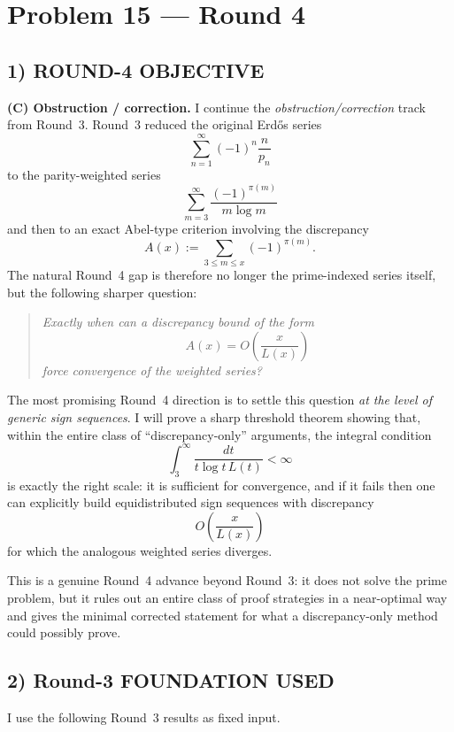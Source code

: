 \section{Problem 15 --- Round 4}

\subsection*{1) ROUND-4 OBJECTIVE}

\textbf{(C) Obstruction / correction.}
I continue the \emph{obstruction/correction} track from Round~3.
Round~3 reduced the original Erd\H{o}s series
\[
\sum_{n=1}^\infty (-1)^n\frac{n}{p_n}
\]
to the parity-weighted series
\[
\sum_{m=3}^\infty \frac{(-1)^{\pi(m)}}{m\log m}
\]
and then to an exact Abel-type criterion involving the discrepancy
\[
A(x):=\sum_{3\le m\le x}(-1)^{\pi(m)}.
\]
The natural Round~4 gap is therefore no longer the prime-indexed series itself, but the following sharper question:

\begin{quote}
\emph{Exactly when can a discrepancy bound of the form}
\[
A(x)=O\!\left(\frac{x}{L(x)}\right)
\]
\emph{force convergence of the weighted series?}
\end{quote}

The most promising Round~4 direction is to settle this question \emph{at the level of generic sign sequences}. I will prove a sharp threshold theorem showing that, within the entire class of ``discrepancy-only'' arguments, the integral condition
\[
\int_3^\infty \frac{dt}{t\log t\,L(t)}<\infty
\]
is exactly the right scale: it is sufficient for convergence, and if it fails then one can explicitly build equidistributed sign sequences with discrepancy
\[
O\!\left(\frac{x}{L(x)}\right)
\]
for which the analogous weighted series diverges.

This is a genuine Round~4 advance beyond Round~3: it does not solve the prime problem, but it rules out an entire class of proof strategies in a near-optimal way and gives the minimal corrected statement for what a discrepancy-only method could possibly prove.

\subsection*{2) Round-3 FOUNDATION USED}

I use the following Round~3 results as fixed input.

